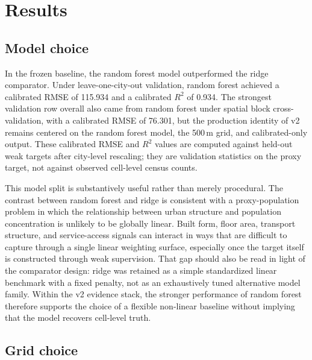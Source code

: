 \section{Results}


\subsection{Model choice}

In the frozen baseline, the random forest model outperformed the ridge comparator. Under leave-one-city-out validation, random forest achieved a calibrated RMSE of 115.934 and a calibrated $R^2$ of 0.934. The strongest validation row overall also came from random forest under spatial block cross-validation, with a calibrated RMSE of 76.301, but the production identity of v2 remains centered on the random forest model, the 500\,m grid, and calibrated-only output. These calibrated RMSE and $R^2$ values are computed against held-out weak targets after city-level rescaling; they are validation statistics on the proxy target, not against observed cell-level census counts.

This model split is substantively useful rather than merely procedural. The contrast between random forest and ridge is consistent with a proxy-population problem in which the relationship between urban structure and population concentration is unlikely to be globally linear. Built form, floor area, transport structure, and service-access signals can interact in ways that are difficult to capture through a single linear weighting surface, especially once the target itself is constructed through weak supervision. That gap should also be read in light of the comparator design: ridge was retained as a simple standardized linear benchmark with a fixed penalty, not as an exhaustively tuned alternative model family. Within the v2 evidence stack, the stronger performance of random forest therefore supports the choice of a flexible non-linear baseline without implying that the model recovers cell-level truth.

\subsection{Grid choice}

